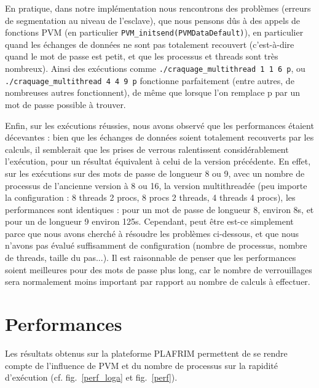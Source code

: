 \documentclass[a4paper,11pt]{article}
\begin{document}
En pratique, dans notre implémentation nous rencontrons des problèmes (erreurs de segmentation au niveau de l'esclave), que nous pensons dûs à des appels de fonctions PVM (en particulier \texttt{PVM\_initsend(PVMDataDefault)}), en particulier quand les échanges de données ne sont pas totalement recouvert (c'est-à-dire quand le mot de passe est petit, et que les processus et threads sont très nombreux).
Ainsi des exécutions comme \texttt{./craquage\_multithread 1 1 6 p}, ou \texttt{./craquage\_multithread 4 4 9 p} fonctionne parfaitement (entre autres, de nombreuses autres fonctionnent), de même que lorsque l'on remplace p par un mot de passe possible à trouver.


Enfin, sur les exécutions réussies, nous avons observé que les performances étaient décevantes : bien que les échanges de données soient totalement recouverts par les calculs, il semblerait que les prises de verrous ralentissent considérablement l'exécution, pour un résultat équivalent à celui de la version précédente.
En effet, sur les exécutions sur des mots de passe de longueur 8 ou 9, avec un nombre de processus de l'ancienne version à 8 ou 16, la version multithreadée (peu importe la configuration : 8 threads 2 procs, 8 procs 2 threads, 4 threads 4 procs), les performances sont identiques : pour un mot de passe de longueur 8, environ 8s, et pour un de longueur 9 environ 125s. 
Cependant, peut être est-ce simplement parce que nous avons cherché à résoudre les problèmes ci-dessous, et que nous n'avons pas évalué suffisamment de configuration (nombre de processus, nombre de threads, taille du pas...).
Il est raisonnable de penser que les performances soient meilleures pour des mots de passe plus long, car le nombre de verrouillages sera normalement moins important par rapport au nombre de calculs à effectuer.

\section{Performances}
Les résultats obtenus sur la plateforme PLAFRIM permettent de se rendre compte de l'influence de PVM et du nombre de processus sur la rapidité d'exécution (cf. fig.~\ref{perf_loga} et fig.~\ref{perf}).
\end{document}
